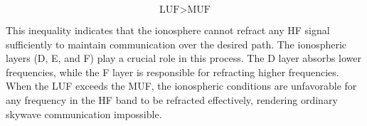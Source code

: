 \[
\text{LUF} > \text{MUF}
\]

This inequality indicates that the ionosphere cannot refract any HF signal sufficiently to maintain communication over the desired path. The ionospheric layers (D, E, and F) play a crucial role in this process. The D layer absorbs lower frequencies, while the F layer is responsible for refracting higher frequencies. When the LUF exceeds the MUF, the ionospheric conditions are unfavorable for any frequency in the HF band to be refracted effectively, rendering ordinary skywave communication impossible.

